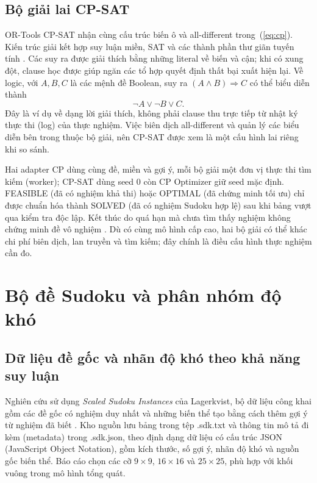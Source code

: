 \documentclass[a4paper]{cas-sc}
\newcommand{\code}[1]{{\rmfamily #1}}
\begin{document}
\subsection{Bộ giải lai CP-SAT}
OR-Tools CP-SAT nhận cùng cấu trúc biến ô và all-different trong~(\ref{eq:cp}). Kiến trúc giải kết hợp suy luận miền, SAT và các thành phần thư giãn tuyến tính \citep{cpsat2023}. Các suy ra được giải thích bằng những literal về biến và cận; khi có xung đột, clause học được giúp ngăn các tổ hợp quyết định thất bại xuất hiện lại. Về logic, với $A,B,C$ là các mệnh đề Boolean, suy ra $(A\land B)\Rightarrow C$ có thể biểu diễn thành
\begin{equation}
\neg A\lor\neg B\lor C.
\end{equation}
Đây là ví dụ về dạng lời giải thích, không phải clause thu trực tiếp từ nhật ký thực thi (log) của thực nghiệm. Việc biên dịch all-different và quản lý các biểu diễn bên trong thuộc bộ giải, nên CP-SAT được xem là một cấu hình lai riêng khi so sánh.

Hai adapter CP dùng cùng đề, miền và gợi ý, mỗi bộ giải một đơn vị thực thi tìm kiếm (worker); CP-SAT dùng seed 0 còn CP Optimizer giữ seed mặc định. FEASIBLE (đã có nghiệm khả thi) hoặc OPTIMAL (đã chứng minh tối ưu) chỉ được chuẩn hóa thành SOLVED (đã có nghiệm Sudoku hợp lệ) sau khi bảng vượt qua kiểm tra độc lập. Kết thúc do quá hạn mà chưa tìm thấy nghiệm không chứng minh đề vô nghiệm \citep{ortoolsDocs}. Dù có cùng mô hình cấp cao, hai bộ giải có thể khác chi phí biên dịch, lan truyền và tìm kiếm; đây chính là điều cấu hình thực nghiệm cần đo.

\section{Bộ đề Sudoku và phân nhóm độ khó}\label{sec:data}
\subsection{Dữ liệu đề gốc và nhãn độ khó theo khả năng suy luận}
Nghiên cứu sử dụng \emph{Scaled Sudoku Instances} của Lagerkvist, bộ dữ liệu công khai gồm các đề gốc có nghiệm duy nhất và những biến thể tạo bằng cách thêm gợi ý từ nghiệm đã biết \citep{corpus,lagerkvist2026}. Kho nguồn lưu bảng trong tệp \code{.sdk.txt} và thông tin mô tả đi kèm (metadata) trong \code{.sdk.json}, theo định dạng dữ liệu có cấu trúc JSON (JavaScript Object Notation), gồm kích thước, số gợi ý, nhãn độ khó và nguồn gốc biến thể. Báo cáo chọn các cỡ $9\times9$, $16\times16$ và $25\times25$, phù hợp với khối vuông trong mô hình tổng quát.
\end{document}

